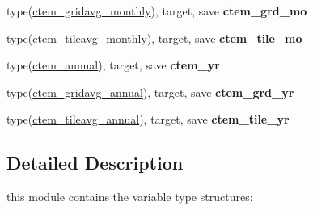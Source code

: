\begin{DoxyCompactItemize}
\item 
\hypertarget{namespacectem__statevars_a0e6e53463d563093cfacf19a1358ec1c}{}type(\hyperlink{structctem__statevars_1_1ctem__gridavg__monthly}{ctem\+\_\+gridavg\+\_\+monthly}), target, save {\bfseries ctem\+\_\+grd\+\_\+mo}\label{namespacectem__statevars_a0e6e53463d563093cfacf19a1358ec1c}

\item 
\hypertarget{namespacectem__statevars_af68043090dc6cd2c0615eb7d4b550b18}{}type(\hyperlink{structctem__statevars_1_1ctem__tileavg__monthly}{ctem\+\_\+tileavg\+\_\+monthly}), target, save {\bfseries ctem\+\_\+tile\+\_\+mo}\label{namespacectem__statevars_af68043090dc6cd2c0615eb7d4b550b18}

\item 
\hypertarget{namespacectem__statevars_aa83b75c65f5aa4de37ef1f55a6a54193}{}type(\hyperlink{structctem__statevars_1_1ctem__annual}{ctem\+\_\+annual}), target, save {\bfseries ctem\+\_\+yr}\label{namespacectem__statevars_aa83b75c65f5aa4de37ef1f55a6a54193}

\item 
\hypertarget{namespacectem__statevars_a3fe8917df668048f8e960e0c5c8427e3}{}type(\hyperlink{structctem__statevars_1_1ctem__gridavg__annual}{ctem\+\_\+gridavg\+\_\+annual}), target, save {\bfseries ctem\+\_\+grd\+\_\+yr}\label{namespacectem__statevars_a3fe8917df668048f8e960e0c5c8427e3}

\item 
\hypertarget{namespacectem__statevars_a74e5918629cea2b5e0e8cd50b271f917}{}type(\hyperlink{structctem__statevars_1_1ctem__tileavg__annual}{ctem\+\_\+tileavg\+\_\+annual}), target, save {\bfseries ctem\+\_\+tile\+\_\+yr}\label{namespacectem__statevars_a74e5918629cea2b5e0e8cd50b271f917}

\end{DoxyCompactItemize}


\subsection{Detailed Description}
this module contains the variable type structures\+: 